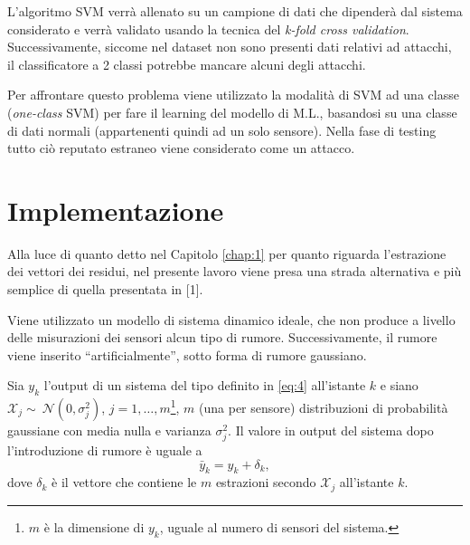 \documentclass[Lau,binding=0.6cm]{sapthesis}
\begin{document}
L'algoritmo SVM verr\`a allenato su un campione di dati che dipender\`a dal sistema considerato e verr\`a validato usando la tecnica del \textit{k-fold cross validation}.
Successivamente, siccome nel dataset non sono presenti dati relativi ad attacchi, il classificatore a 2 classi potrebbe mancare alcuni degli attacchi.

Per affrontare questo problema viene utilizzato la modalit\`a di SVM ad una classe (\textit{one-class} SVM) per fare il learning del modello di M.L., basandosi su una classe di dati normali (appartenenti quindi ad un solo sensore). 
Nella fase di testing tutto ci\`o reputato estraneo viene considerato come un attacco.


\chapter{Implementazione}\label{chap:4}
Alla luce di quanto detto nel Capitolo \ref{chap:1} per quanto riguarda l'estrazione dei vettori dei residui, nel presente lavoro viene presa una strada alternativa e pi\`u semplice di quella presentata in [1].

Viene utilizzato un modello di sistema dinamico ideale, che non produce a livello delle misurazioni dei sensori alcun tipo di rumore. Successivamente, il rumore viene inserito ``artificialmente'', sotto forma di rumore gaussiano.

Sia $y_k$ l'output di un sistema del tipo definito in \ref{eq:4} all'istante $k$ e siano $\mathcal{X}_j \sim~\mathcal{N}(0,\sigma_j^2)$, $j = 1,\ldots,m$\footnote{{$m$ \`e la dimensione di $y_k$, uguale al numero di sensori del sistema.}}, $m$ (una per sensore) distribuzioni di probabilit\`a gaussiane con media nulla e varianza $\sigma_j^2$.
Il valore in output del sistema dopo l'introduzione di rumore \`e uguale a
\begin{equation}
    \bar{y}_k = y_k + \delta_k\label{eq:6},
\end{equation}
dove $\delta_k$ \`e il vettore che contiene le $m$ estrazioni secondo $\mathcal{X}_j$ all'istante $k$.
\end{document}
